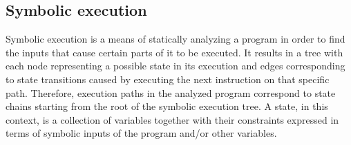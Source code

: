 \subsection{Symbolic execution}\label{sub-sec:symb-exec}

Symbolic execution is a means of statically analyzing a program in order to
find the inputs that cause certain parts of it to be executed.  It results in a
tree with each node representing a possible state in its execution and edges
corresponding to state transitions caused by executing the next instruction on
that specific path.  Therefore, execution paths in the analyzed program
correspond to state chains starting from the root of the symbolic execution
tree.  A state, in this context, is a collection of variables together with
their constraints expressed in terms of symbolic inputs of the program and/or
other variables.

